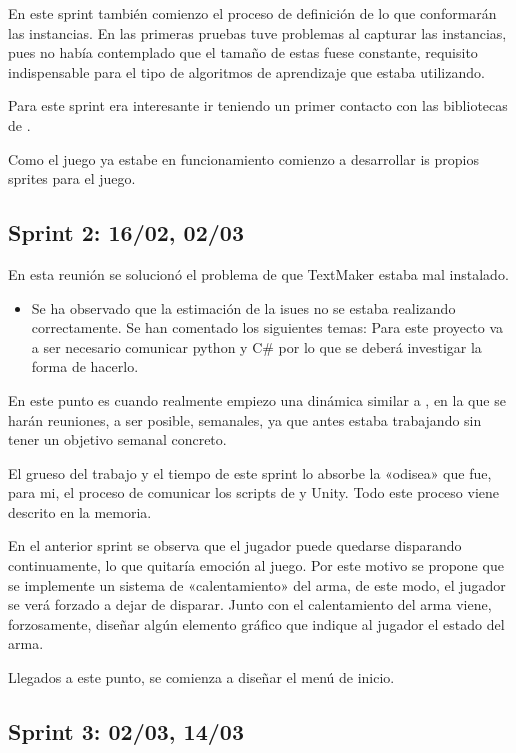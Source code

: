 En este sprint también comienzo el proceso de definición de lo que conformarán las instancias. En las primeras pruebas tuve problemas al capturar las instancias, pues no había contemplado que el tamaño de estas fuese constante, requisito indispensable para el tipo de algoritmos de aprendizaje que estaba utilizando.

Para este sprint era interesante ir teniendo un primer contacto con las bibliotecas de .

Como el juego ya estabe en funcionamiento comienzo a desarrollar is propios sprites para el juego.


\subsection{Sprint 2:  16/02, 02/03}

 En esta reunión se solucionó el problema de que TextMaker estaba mal instalado.
\begin{itemize}
    \item Se ha observado que la estimación de la isues no se estaba realizando correctamente.
    Se han comentado los siguientes temas: Para este proyecto va a ser necesario comunicar python y C\# por lo que se deberá investigar la forma de hacerlo.
\end{itemize}

En este punto es cuando realmente empiezo una dinámica similar a , en la que se harán reuniones, a ser posible, semanales, ya que antes estaba trabajando sin tener un objetivo semanal concreto.

El grueso del trabajo y el tiempo de este sprint lo absorbe la «odisea» que fue, para mi, el proceso de comunicar los scripts de  y Unity. Todo este proceso viene descrito en la memoria.

En el anterior sprint se observa que el jugador puede quedarse disparando continuamente, lo que quitaría emoción al juego. Por este motivo se propone que se implemente un sistema de «calentamiento» del arma, de este modo, el jugador se verá forzado a dejar de disparar. Junto con el calentamiento del arma viene, forzosamente, diseñar algún elemento gráfico que indique al jugador el estado del arma.

Llegados a este punto, se comienza a diseñar el menú de inicio.


\subsection{Sprint 3:  02/03, 14/03}


